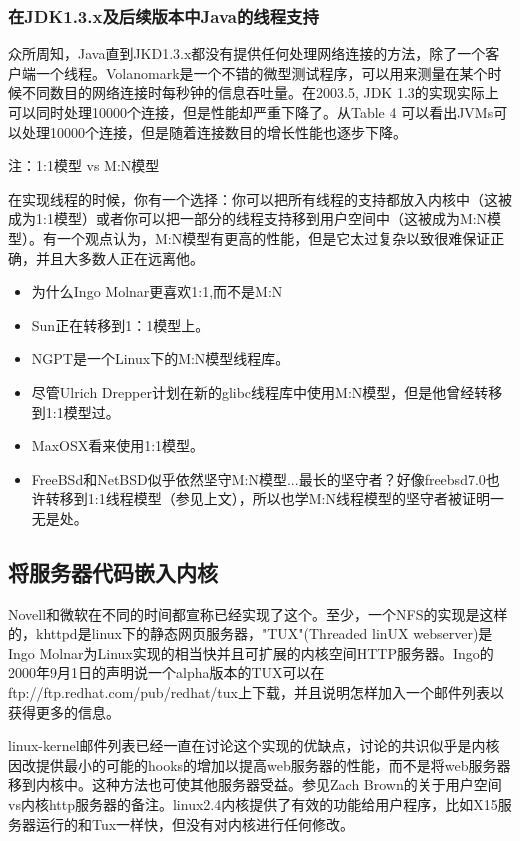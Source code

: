 \documentclass[12pt, twoside, a4paper, xetex]{report}
\begin{document}
\subsubsection*{在JDK1.3.x及后续版本中Java的线程支持}

	众所周知，Java直到JKD1.3.x都没有提供任何处理网络连接的方法，除了一个客户端一个线程。Volanomark是一个不错的微型测试程序，可以用来测量在某个时候不同数目的网络连接时每秒钟的信息吞吐量。在2003.5, JDK 1.3的实现实际上可以同时处理10000个连接，但是性能却严重下降了。从Table 4 可以看出JVMs可以处理10000个连接，但是随着连接数目的增长性能也逐步下降。

	注：1:1模型 vs M:N模型

	在实现线程的时候，你有一个选择：你可以把所有线程的支持都放入内核中（这被成为1:1模型）或者你可以把一部分的线程支持移到用户空间中（这被成为M:N模型）。有一个观点认为，M:N模型有更高的性能，但是它太过复杂以致很难保证正确，并且大多数人正在远离他。
	\begin{itemize}
		\item 为什么Ingo Molnar更喜欢1:1,而不是M:N
		\item Sun正在转移到1：1模型上。
		\item NGPT是一个Linux下的M:N模型线程库。
		\item 尽管Ulrich Drepper计划在新的glibc线程库中使用M:N模型，但是他曾经转移到1:1模型过。
		\item MaxOSX看来使用1:1模型。
		\item FreeBSd和NetBSD似乎依然坚守M:N模型...最长的坚守者？好像freebsd7.0也许转移到1:1线程模型（参见上文），所以也学M:N线程模型的坚守者被证明一无是处。
	\end{itemize}
\subsection*{将服务器代码嵌入内核}

	Novell和微软在不同的时间都宣称已经实现了这个。至少，一个NFS的实现是这样的，khttpd是linux下的静态网页服务器，"TUX"(Threaded linUX webserver)是Ingo Molnar为Linux实现的相当快并且可扩展的内核空间HTTP服务器。Ingo的2000年9月1日的声明说一个alpha版本的TUX可以在ftp://ftp.redhat.com/pub/redhat/tux上下载，并且说明怎样加入一个邮件列表以获得更多的信息。

	linux-kernel邮件列表已经一直在讨论这个实现的优缺点，讨论的共识似乎是内核因改提供最小的可能的hooks的增加以提高web服务器的性能，而不是将web服务器移到内核中。这种方法也可使其他服务器受益。参见Zach Brown的关于用户空间vs内核http服务器的备注。linux2.4内核提供了有效的功能给用户程序，比如X15服务器运行的和Tux一样快，但没有对内核进行任何修改。
	
\end{document}
